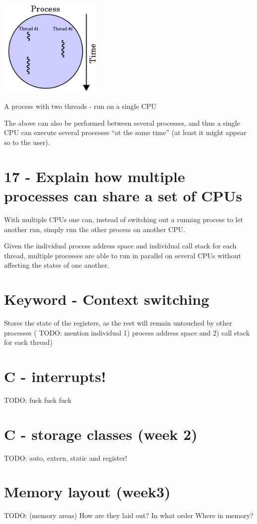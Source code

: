 \documentclass{article}
\begin{document}
\begin{center}
\includegraphics[width=5.0cm]{images/220px-Multithreaded_process.png}



A process with two threads - run on a single CPU
\end{center}
The above can also be performed between several processes, and thus a single CPU can execute several processes ``at the same time'' (at least it might appear so to the user).

\section*{17 - Explain how multiple processes can share a set of CPUs}
With multiple CPUs one can, instead of switching out a running process to let another run, simply run the other process on another CPU.

Given the individual process address space and individual call stack for each thread, multiple processes are able to run in parallel on several CPUs without affecting the states of one another.

\section*{Keyword - Context switching}
Stores the state of the registers, as the rest will remain untouched by other processes (
TODO: mention individual 1) process address space and 2) call stack for each thread)


\section*{C - interrupts!}
TODO: fuck fuck fuck


\section*{C - storage classes (week 2)}
TODO: auto, extern, static and register!


\section*{Memory layout (week3)}
TODO: (memory areas) How are they laid out? In what order Where in memory?
\end{document}

